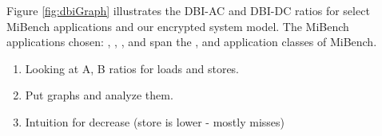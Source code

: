 Figure \ref{fig:dbiGraph} illustrates the DBI-AC and DBI-DC ratios for select
MiBench applications and our encrypted system model. The MiBench applications
chosen: , , , and  span the
,  and  application classes of MiBench.

\begin{enumerate}
  \item Looking at A, B ratios for loads and stores.
  \item Put graphs and analyze them.
  \item Intuition for decrease (store is lower - mostly misses)
\end{enumerate}
